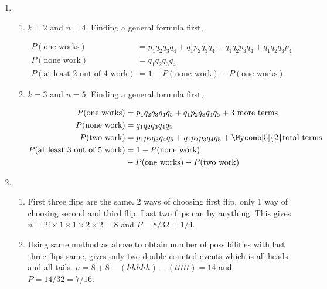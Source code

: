 \begin{enumerate}
	\item \begin{enumerate}
		\item $ k = 2 $ and $ n = 4 $. Finding a general formula first, 
		
		\begin{subequations}
			\begin{align}
				P(\text{one works}) &= p_1 q_2 q_3 q_4 + q_1 p_2 q_3 q_4 + q_1 q_2 p_3 q_4 + q_1 q_2 q_3 p_4 \\
				P(\text{none work}) &= q_1 q_2 q_3 q_4 \\
				P(\text{at least 2 out of 4 work}) &= 1 - P(\text{none work}) - P(\text{one works})
			\end{align}
		\end{subequations}
		
		\item $ k = 3 $ and $ n = 5 $. Finding a general formula first, 
		
		\begin{subequations}
			\begin{align}
				P(\text{one works}) &= p_1 q_2 q_3 q_4 q_5 + q_1 p_2 q_3 q_4 q_5 + \text{3 more terms} \\
				P(\text{none work}) &= q_1 q_2 q_3 q_4 q_5\\
				P(\text{two work}) &= p_1 p_2 q_3 q_4 q_5 + q_1 p_2 p_3 q_4 q_5 + \Mycomb[5]{2}\text{total terms} \\
				P(\text{at least 3 out of 5 work}) &= 1 - P(\text{none work}) \nonumber \\
				&- P(\text{one works}) - P(\text{two work})
			\end{align}
		\end{subequations}
	\end{enumerate}
	
	\item \begin{enumerate}
		\item First three flips are the same. 2 ways of choosing first flip. only 1 way of choosing second and third flip. Last two flips can by anything.
		This gives $ n = 2! \times 1 \times 1 \times 2 \times 2  = 8$ and $ P = 8/32 = 1/4 $.
		
		\item Using same method as above to obtain number of possibilities with last three flips same, gives only two double-counted events which is all-heads and all-tails.
		$ n = 8 + 8 - (hhhhh) - (ttttt)  = 14$ and $ P = 14/32 = 7/16 $.
		

\end{enumerate}
\end{enumerate}

